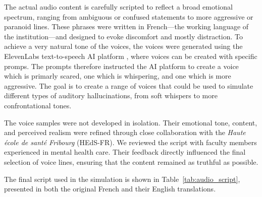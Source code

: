 \vspace{1em}
The actual audio content is carefully scripted to reflect a broad emotional spectrum, ranging from ambiguous or confused statements to more aggressive or paranoid lines. These phrases were written in French—the working language of the institution—and designed to evoke discomfort and mostly distraction. To achieve a very natural tone of the voices, the voices were generated using the ElevenLabs text-to-speech AI platform \cite{elevenlabs}, where voices can be created with specific promps. The prompts therefore instructed the AI platform to create a voice which is primarly scared, one which is whispering, and one which is more aggressive. The goal is to create a range of voices that could be used to simulate different types of auditory hallucinations, from soft whispers to more confrontational tones.

The voice samples were not developed in isolation. Their emotional tone, content, and perceived realism were refined through close collaboration with the \textit{Haute école de santé Fribourg} (HEdS-FR). We reviewed the script with faculty members experienced in mental health care. Their feedback directly influenced the final selection of voice lines, ensuring that the content remained as truthful as possible. 

\vspace{1em}
The final script used in the simulation is shown in Table~\ref{tab:audio_script}, presented in both the original French and their English translations.


